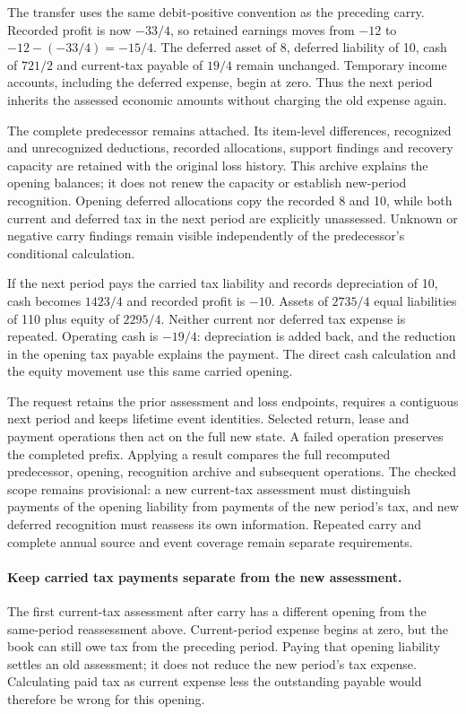 The transfer uses the same debit-positive convention as the preceding carry.
Recorded profit is now $-33/4$, so retained earnings moves from $-12$ to
$-12-(-33/4)=-15/4$. The deferred asset of 8, deferred liability of 10, cash of
$721/2$ and current-tax payable of $19/4$ remain unchanged. Temporary income
accounts, including the deferred expense, begin at zero. Thus the next period
inherits the assessed economic amounts without charging the old expense again.

The complete predecessor remains attached. Its item-level differences,
recognized and unrecognized deductions, recorded allocations, support findings
and recovery capacity are retained with the original loss history. This archive
explains the opening balances; it does not renew the capacity or establish
new-period recognition. Opening deferred allocations copy the recorded 8 and
10, while both current and deferred tax in the next period are explicitly
unassessed. Unknown or negative carry findings remain visible independently of
the predecessor's conditional calculation.

If the next period pays the carried tax liability and records depreciation of
10, cash becomes $1423/4$ and recorded profit is $-10$. Assets of $2735/4$
equal liabilities of 110 plus equity of $2295/4$. Neither current nor deferred
tax expense is repeated. Operating cash is $-19/4$: depreciation is added back,
and the reduction in the opening tax payable explains the payment. The direct
cash calculation and the equity movement use this same carried opening.

The request retains the prior assessment and loss endpoints, requires a
contiguous next period and keeps lifetime event identities. Selected return,
lease and payment operations then act on the full new state. A failed operation
preserves the completed prefix. Applying a result compares the full recomputed
predecessor, opening, recognition archive and subsequent operations. The checked
scope remains provisional: a new current-tax assessment must distinguish
payments of the opening liability from payments of the new period's tax, and
new deferred recognition must reassess its own information. Repeated carry and
complete annual source and event coverage remain separate requirements.


\paragraph{Keep carried tax payments separate from the new assessment.}
The first current-tax assessment after carry has a different opening from the
same-period reassessment above. Current-period expense begins at zero, but the
book can still owe tax from the preceding period. Paying that opening liability
settles an old assessment; it does not reduce the new period's tax expense.
Calculating paid tax as current expense less the outstanding payable would
therefore be wrong for this opening.

